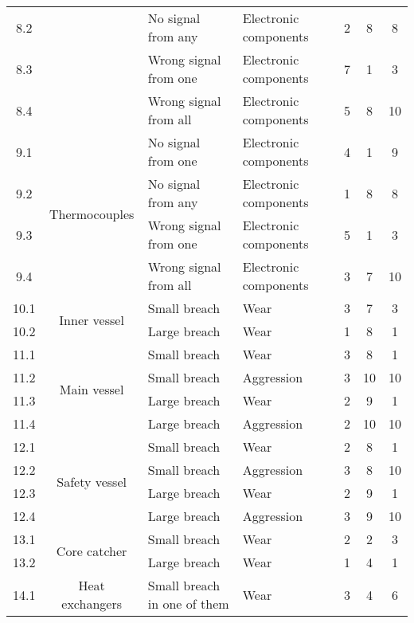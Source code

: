 \begin{longtable}{ccp{4cm}p{4cm}ccc}
    8.2 &                               & No signal from any & Electronic components & 2 & 8 & 8 \\
    8.3 &                               & Wrong signal from one & Electronic components & 7 & 1 & 3 \\
    8.4 &                               & Wrong signal from all & Electronic components & 5 & 8 & 10 \\ \hline
    9.1 & \multirow{4}{3cm}{Thermocouples}  & No signal from one & Electronic components & 4 & 1 & 9 \\
    9.2 &                               & No signal from any & Electronic components & 1 & 8 & 8 \\
    9.3 &                               & Wrong signal from one & Electronic components & 5 & 1 & 3 \\
    9.4 &                               & Wrong signal from all & Electronic components & 3 & 7 & 10 \\ \hline
    10.1 & \multirow{2}{3cm}{Inner vessel}  & Small breach & Wear & 3 & 7 & 3 \\
    10.2 &                               & Large breach & Wear & 1 & 8 & 1 \\ \hline
    11.1 & \multirow{4}{3cm}{Main vessel}  & Small breach & Wear & 3 & 8 & 1 \\
    11.2 &                               & Small breach & Aggression & 3 & 10 & 10 \\
    11.3 &                               & Large breach & Wear & 2 & 9 & 1 \\
    11.4 &                               & Large breach & Aggression & 2 & 10 & 10 \\ \hline
    12.1 & \multirow{4}{3cm}{Safety vessel}  & Small breach & Wear & 2 & 8 & 1 \\
    12.2 &                               & Small breach & Aggression & 3 & 8 & 10 \\
    12.3 &                               & Large breach & Wear & 2 & 9 & 1 \\
    12.4 &                               & Large breach & Aggression & 3 & 9 & 10 \\ \hline
    13.1 & \multirow{2}{3cm}{Core catcher} & Small breach & Wear & 2 & 2 & 3 \\
    13.2 &                               & Large breach & Wear & 1 & 4 & 1 \\ \hline
    14.1 & \multirow{4}{3cm}{Heat exchangers}  & Small breach in one of them & Wear & 3 & 4 & 6 \\

\end{longtable}
